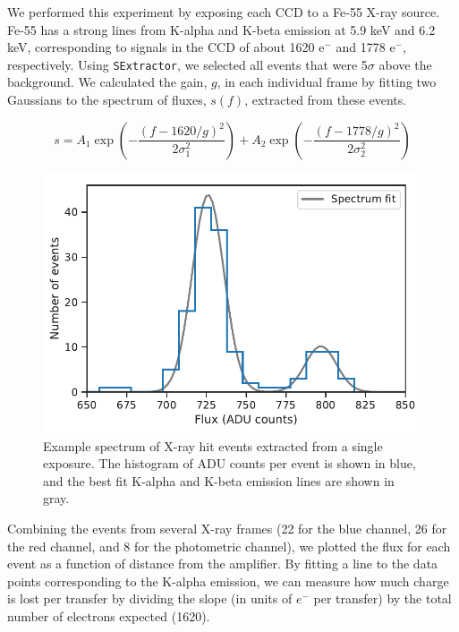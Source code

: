 We performed this experiment by exposing each CCD to a Fe-55 X-ray source. Fe-55 has a strong lines from K-alpha and K-beta emission at 5.9 keV and 6.2 keV, corresponding to signals in the CCD of about 1620 $\textrm{e}^-$ and 1778 $\textrm{e}^-$, respectively. Using \verb|SExtractor|, we selected all events that were 5$\sigma$ above the background. We calculated the gain, $g$, in each individual frame by fitting two Gaussians to the spectrum of fluxes, $s(f)$, extracted from these events.

\begin{equation}
    s = A_1 \exp\left(-\frac{(f-1620/g)^2}{2\sigma_1^2}\right) + A_2 \exp\left(-\frac{(f-1778/g)^2}{2\sigma_2^2}\right)
\end{equation}

\begin{figure}
    \centering
    \includegraphics{figures/cte/spectrum_fit.pdf}
    \caption{Example spectrum of X-ray hit events extracted from a single exposure. The histogram of ADU counts per event is shown in blue, and the best fit K-alpha and K-beta emission lines are shown in gray.}
    \label{fig:xray_spectrum}
\end{figure}

Combining the events from several X-ray frames (22 for the blue channel, 26 for the red channel, and 8 for the photometric channel), we plotted the flux for each event as a function of distance from the amplifier. By fitting a line to the data points corresponding to the K-alpha emission, we can measure how much charge is lost per transfer by dividing the slope (in units of $e^-$ per transfer) by the total number of electrons expected (1620).

